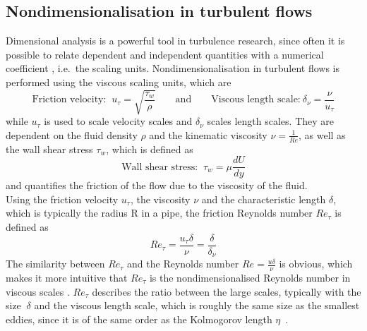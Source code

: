 \subsection{Nondimensionalisation in turbulent flows}\label{subsec: Nondimensionalisation of turbulent flows}
Dimensional analysis is a powerful tool in turbulence research, since often it is possible to relate dependent and independent quantities with a numerical coefficient \citep{tennekesFirstCourseTurbulence1972}, i.e.\ the scaling units.
Nondimensionalisation in turbulent flows is performed using the viscous scaling units, which are
\begin{equation}\label{eq: viscous scaling units}
    \text{Friction velocity: }\ u_\tau = \sqrt{\frac{\tau_w}{\rho}} \qquad \text{and} \qquad \text{Viscous length scale:}\ \delta_\nu = \frac{\nu}{u_\tau}
\end{equation}
while $u_\tau$ is used to scale velocity scales and $\delta_\nu$ scales length scales.
They are dependent on the fluid density $\rho$ and the kinematic viscosity $\nu = \frac{1}{Re}$, as well as the wall shear stress $\tau_w$, which is defined as
\begin{equation}\label{eq: wall shear stress}
   \text{Wall shear stress: } \ \tau_w = \mu \frac{d U}{dy}
\end{equation}
and quantifies the friction of the flow due to the viscosity of the fluid.\\
Using the friction velocity $u_\tau$, the viscosity $\nu$ and the characteristic length $\delta$, which is typically the radius R in a pipe, the friction Reynolds number $Re_\tau$ is defined as
\begin{equation}\label{eq: friction reynolds number}
   Re_\tau = \frac{u_\tau \delta}{\nu} = \frac{\delta}{\delta_\nu}
\end{equation}
The similarity between $Re_\tau$ and the Reynolds number $Re = \frac{u \delta}{\nu}$ is obvious, which makes it more intuitive that $Re_\tau$ is the nondimensionalised Reynolds number in viscous scales \citep{popeTurbulentFlows2015}. 
$Re_\tau$ describes the ratio between the large scales, typically with the size $~\delta$ and the viscous length scale, which is roughly the same size as the smallest eddies, since it is of the same order as the Kolmogorov length $\eta$~\citep{marusicWallboundedTurbulentFlows2010, jimenezNearwallTurbulence2013}.\\
